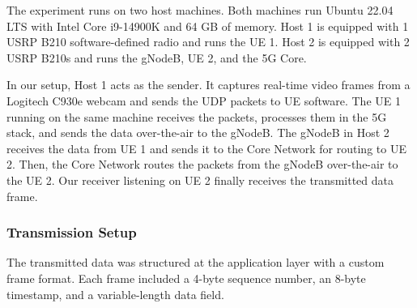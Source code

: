The experiment runs on two host machines. Both machines run Ubuntu 22.04 LTS with Intel Core i9-14900K and 64 GB of memory. Host 1 is equipped with 1 USRP B210 software-defined radio and runs the UE 1. Host 2 is equipped with 2 USRP B210s and runs the gNodeB, UE 2, and the 5G Core.  

In our setup, Host 1 acts as the sender. It captures real-time video frames from a Logitech C930e webcam and sends the UDP packets to UE software. The UE 1 running on the same machine receives the packets, processes them in the 5G stack, and sends the data over-the-air to the gNodeB. The gNodeB in Host 2 receives the data from UE 1 and sends it to the Core Network for routing to UE 2. Then, the Core Network routes the packets from the gNodeB over-the-air to the UE 2. Our receiver listening on UE 2 finally receives the transmitted data frame. 


\subsubsection{Transmission Setup}
The transmitted data was structured at the application layer with a custom frame format. Each frame included a 4-byte sequence number, an 8-byte timestamp, and a variable-length data field. 

\renewcommand{\arraystretch}{1.9}

